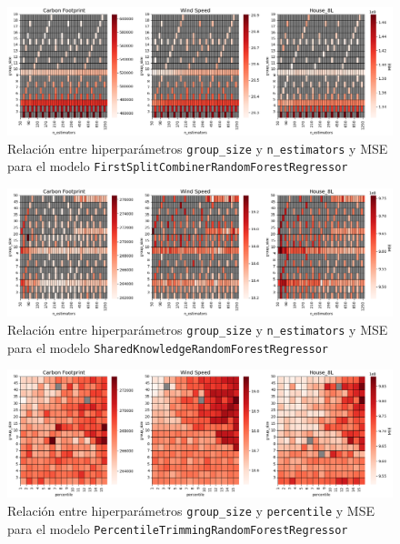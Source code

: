 \begin{figure}[h]
\centering
    \includegraphics[width=1\textwidth]{figures/marco-metodologico/heatmaps/heatmap_fsc.png}
\caption{Relación entre hiperparámetros \texttt{group\_size} y \texttt{n\_estimators} y MSE para el modelo \texttt{FirstSplitCombinerRandomForestRegressor}}
\end{figure}
\label{figure8}

\begin{figure}[h]
\centering
    \includegraphics[width=1\textwidth]{figures/marco-metodologico/heatmaps/heatmap_sk.png}
\caption{Relación entre hiperparámetros \texttt{group\_size} y \texttt{n\_estimators} y MSE para el modelo \texttt{SharedKnowledgeRandomForestRegressor}}
\end{figure}
\label{figure9}

\FloatBarrier

\begin{figure}[h]
\centering
    \includegraphics[width=1\textwidth]{figures/marco-metodologico/heatmaps/heatmap_percentile_vs_group_size.png}
\caption{Relación entre hiperparámetros \texttt{group\_size} y \texttt{percentile} y MSE para el modelo \texttt{PercentileTrimmingRandomForestRegressor}}
\end{figure}
\label{figure10}



